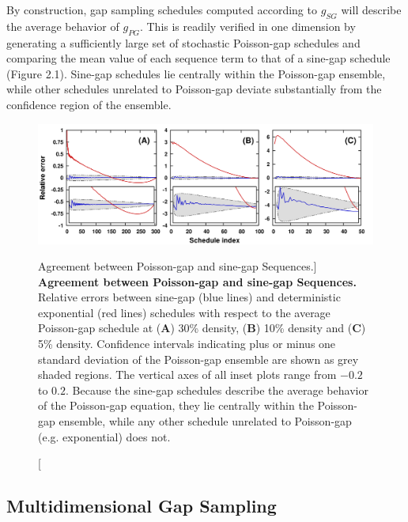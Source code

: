 \begin{doublespace}
By construction, gap sampling schedules computed according to $g_{SG}$ will
describe the average behavior of $g_{PG}$. This is readily verified in one
dimension by generating a sufficiently large set of stochastic Poisson-gap
schedules and comparing the mean value of each sequence term to that of a
sine-gap schedule (Figure 2.1). Sine-gap schedules lie centrally within the
Poisson-gap ensemble, while other schedules unrelated to Poisson-gap
deviate substantially from the confidence region of the ensemble.
\end{doublespace}

\begin{figure}[ht!]
\includegraphics[width=6.5in]{figs/dgs/01-avepg.png}
\caption
      [Agreement between Poisson-gap and sine-gap Sequences.]{
  {\bf Agreement between Poisson-gap and sine-gap Sequences.}
  \\
  Relative errors between sine-gap (blue lines) and deterministic exponential
  (red lines) schedules with respect to the average Poisson-gap schedule at
  ({\bf A}) 30\% density, ({\bf B}) 10\% density and ({\bf C}) 5\% density.
  Confidence intervals indicating plus or minus one standard deviation of the
  Poisson-gap ensemble are shown as grey shaded regions. The vertical axes of
  all inset plots range from $-0.2$ to $0.2$. Because the sine-gap schedules
  describe the average behavior of the Poisson-gap equation, they lie
  centrally within the Poisson-gap ensemble, while any other schedule
  unrelated to Poisson-gap (e.g. exponential) does not.
}
\end{figure}

\subsection{Multidimensional Gap Sampling}

